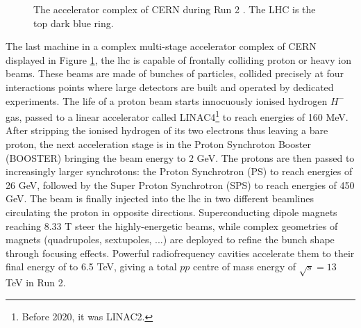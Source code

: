\begin{figure}[!h]
  \centering
  \caption{The accelerator complex of CERN during Run 2 \cite{CERNAcc}. The LHC is the top dark blue ring.}
  \label{fig-CernAccSys}
\end{figure}

The last machine in a complex multi-stage accelerator complex of CERN displayed in Figure \ref{fig-CernAccSys}, the \gls{lhc} is capable of frontally colliding proton or heavy ion beams. These beams are made of bunches of particles, collided precisely at four interactions points where large detectors are built and operated by dedicated experiments. The life of a proton beam starts innocuously ionised hydrogen $H^-$ gas, passed to a linear accelerator called LINAC4\footnote{Before 2020, it was LINAC2.} to reach energies of 160 MeV. After stripping the ionised hydrogen of its two electrons thus leaving a bare proton, the next acceleration stage is in the Proton Synchroton Booster (BOOSTER) bringing the beam energy to 2 GeV. The protons are then passed to increasingly larger synchrotons: the Proton Synchrotron (PS) to reach energies of 26 GeV, followed by the Super Proton Synchrotron (SPS) to reach energies of 450 GeV. The beam is finally injected into the \gls{lhc} in two different beamlines circulating the proton in opposite directions. Superconducting dipole magnets reaching 8.33 T steer the highly-energetic beams, while complex geometries of magnets (quadrupoles, sextupoles, ...) are deployed to refine the bunch shape through focusing effects. Powerful radiofrequency cavities accelerate them to their final energy of to 6.5 TeV, giving a total $pp$ centre of mass energy of $\sqrt{s} = 13$ TeV in Run 2.  \\


